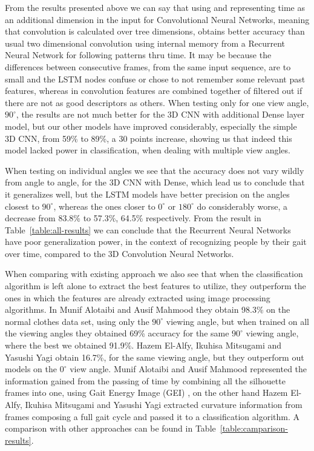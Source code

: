 \documentclass[12pt]{article}
\theoremstyle{definition}
\begin{document}
	From the results presented above we can say that using and representing time as an additional dimension in the input for Convolutional Neural Networks, meaning that convolution is calculated over tree dimensions, obtains better accuracy than usual two dimensional convolution using internal memory from a Recurrent Neural Network for following patterns thru time. It may be because the differences between consecutive frames, from the same input sequence, are to small and the LSTM nodes confuse or chose to not remember some relevant past features, whereas in convolution features are combined together of filtered out if there are not as good descriptors as others. When testing only for one view angle, $90^\circ$, the results are not much better for the 3D CNN with additional Dense layer model, but our other models have improved considerably, especially the simple 3D CNN, from 59\% to 89\%, a 30 points increase, showing us that indeed this model lacked power in classification, when dealing with multiple view angles.

	When testing on individual angles we see that the accuracy does not vary wildly from angle to angle, for the 3D CNN with Dense, which lead us to conclude that it generalizes well, but the LSTM models have better precision on the angles closest to $90^\circ$, whereas the ones closer to $0^\circ$ or $180^\circ$ do considerably worse, a decrease from 83.8\% to 57.3\%, 64.5\% respectively. From the result in Table~\ref{table:all-results} we can conclude that the Recurrent Neural Networks have poor generalization power, in the context of recognizing people by their gait over time, compared to the 3D Convolution Neural Networks.

	When comparing with existing approach we also see that when the classification algorithm is left alone to extract the best features to utilize, they outperform the ones in which the features are already extracted using image processing algorithms. In Munif Alotaibi and Ausif Mahmood \cite{gait-with-gei} they obtain 98.3\% on the normal clothes data set, using only the $90^\circ$ viewing angle, but when trained on all the viewing angles they obtained 69\% accuracy for the same $90^\circ$ viewing angle, where the best we obtained 91.9\%. Hazem El-Alfy, Ikuhisa Mitsugami and Yasushi Yagi \cite{gait-with-curvature-map} obtain 16.7\%, for the same viewing angle, but they outperform out models on the $0^\circ$ view angle. Munif Alotaibi and Ausif Mahmood represented the information gained from the passing of time by combining all the silhouette frames into one, using Gait Energy Image (GEI) \cite{gei}, on the other hand Hazem El-Alfy, Ikuhisa Mitsugami and Yasushi Yagi extracted curvature information from frames composing a full gait cycle and passed it to a classification algorithm. A comparison with other approaches can be found in Table~\ref{table:camparison-results}.
\end{document}
